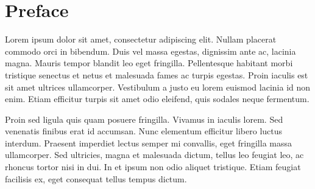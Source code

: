 \chapter{Preface}

Lorem ipsum dolor sit amet, consectetur adipiscing elit. Nullam placerat commodo orci in bibendum. Duis vel massa egestas, dignissim ante ac, lacinia magna. Mauris tempor blandit leo eget fringilla. Pellentesque habitant morbi tristique senectus et netus et malesuada fames ac turpis egestas. Proin iaculis est sit amet ultrices ullamcorper. Vestibulum a justo eu lorem euismod lacinia id non enim. Etiam efficitur turpis sit amet odio eleifend, quis sodales neque fermentum. 

Proin sed ligula quis quam posuere fringilla. Vivamus in iaculis lorem. Sed venenatis finibus erat id accumsan. Nunc elementum efficitur libero luctus interdum. Praesent imperdiet lectus semper mi convallis, eget fringilla massa ullamcorper. Sed ultricies, magna et malesuada dictum, tellus leo feugiat leo, ac rhoncus tortor nisi in dui. In et ipsum non odio aliquet tristique. Etiam feugiat facilisis ex, eget consequat tellus tempus dictum.
